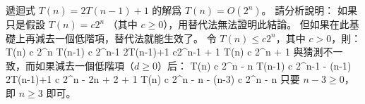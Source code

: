 \startEXERCISE
遞迴式 $T(n)=2T(n-1)+1$ 的解爲 $T(n)=O(2^n)$。
請分析說明：
如果只是假設 $T(n)=c 2^n$ （其中 $c\ge 0$），用替代法無法證明此結論。
但如果在此基礎上再減去一個低階項，替代法就能生效了。
\stopEXERCISE
\startANSWER
令 $T(n)\le c 2^n$，其中 $c>0$，則：
\startformula\startmathalignment
\NC T(n) \NC \le c 2^n \NR
\NC T(n-1) \NC \le c 2^{n-1} \NR
\NC 2T(n-1)+1 \NC {} c2^{n-1} + 1 \NR
\NC T(n) \NC \le c 2^n + 1 \NR
\stopmathalignment\stopformula
與猜測不一致，而如果減去一個低階項（$d\ge 0$）后：
\startformula\startmathalignment
\NC T(n) \NC \le c 2^n - n \NR
\NC T(n-1) \NC \le c 2^{n-1} - (n-1) \NR
\NC 2T(n-1)+1 \NC \le c 2^n - 2n + 2 + 1 \NR
\NC T(n) \NC \le c 2^n - n - (n-3) \le c 2^n - n \NR
\stopmathalignment\stopformula
只要 $n-3\ge 0$，即 $n\ge 3$ 即可。
\stopANSWER

\stopsection
